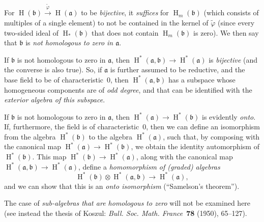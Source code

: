 \documentclass{article}
\newcommand{\fk}{\mathfrak}
\DeclareMathOperator{\HH}{H}
\begin{document}
For $\HH(\fk{b})\xrightarrow{\widetilde{\varphi}}\HH(\fk{a})$ to be \emph{bijective}, it \emph{suffices} for $\HH_m(\fk{b})$ (which consists of multiples of a single element) to not be contained in the kernel of $\widetilde{\varphi}$ (since every two-sided ideal of $\HH_*(\fk{b})$ that does not contain $\HH_m(\fk{b})$ is zero).
We then say that $\fk{b}$ is \emph{not homologous to zero in $\fk{a}$}.

If $\fk{b}$ is not homologous to zero in $\fk{a}$, then $\HH^*(\fk{a},\fk{b})\to\HH^*(\fk{a})$ is \emph{bijective} (and the converse is also true).
So, if $\fk{a}$ is further assumed to be reductive, and the base field to be of characteristic~$0$, then $\HH^*(\fk{a},\fk{b})$ has a subspace whose homogeneous components are of \emph{odd degree}, and that can be identified with the \emph{exterior algebra of this subspace}.

If $\fk{b}$ is not homologous to zero in $\fk{a}$, then $\HH^*(\fk{a})\to\HH^*(\fk{b})$ is evidently \emph{onto}.
If, furthermore, the field is of characteristic~$0$, then we can define an isomorphism from the algebra $\HH^*(\fk{b})$ to the algebra $\HH^*(\fk{a})$, such that, by composing with the canonical map $\HH^*(\fk{a})\to\HH^*(\fk{b})$, we obtain the identity automorphism of $\HH^*(\fk{b})$.
This map $\HH^*(\fk{b})\to\HH^*(\fk{a})$, along with the canonical map $\HH^*(\fk{a},\fk{b})\to\HH^*(\fk{a})$, define a \emph{homomorphism of (graded) algebras}
\[
  \HH^*(\fk{b})\otimes\HH^*(\fk{a},\fk{b}) \to \HH^*(\fk{a}),
\]
and we can show that this is an \emph{onto isomorphism} (``Samelson's theorem'').

The case of \emph{sub-algebras that are homologous to zero} will not be examined here (see instead the thesis of Koszul: \emph{Bull. Soc. Math. France}~\textbf{78} (1950), 65--127).
\end{document}
